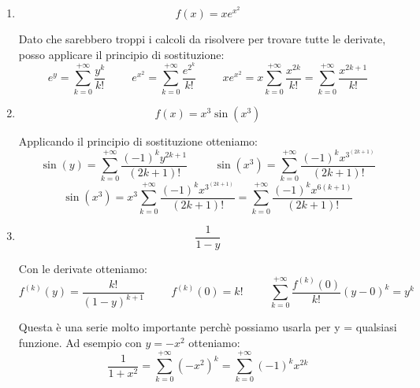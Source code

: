\begin{exercise}\phantom{}
    \begin{enumerate}
        \item \begin{equation*}f(x)=xe^{x^2}\end{equation*}
    
    Dato che sarebbero troppi i calcoli da risolvere per trovare tutte le derivate, posso applicare il principio di sostituzione:
    \begin{equation*}
        e^y=\sum^{+\infty}_{k=0}\frac{y^k}{k!}\hspace{1cm}e^{x^2}=\sum^{+\infty}_{k=0}\frac{e^{2^k}}{k!}\hspace{1cm}xe^{x^2}=x\sum^{+\infty}_{k=0}\frac{x^{2k}}{k!}=\sum^{+\infty}_{k=0}\frac{x^{2k+1}}{k!}
    \end{equation*}
    
        
        \item \begin{equation*}f(x)=x^3\sin(x^3)\end{equation*}
        
        Applicando il principio di sostituzione otteniamo:
        \begin{equation*}
            \sin(y)=\sum^{+\infty}_{k=0}\frac{(-1)^ky^{2k+1}}{(2k+1)!}\hspace{1cm}\sin(x^3)=\sum^{+\infty}_{k=0}\frac{(-1)^kx^{3^{(2k+1)}}}{(2k+1)!}
        \end{equation*}
        \begin{equation*}
            \sin(x^3)=x^3\sum^{+\infty}_{k=0}\frac{(-1)^kx^{3^{(2k+1)}}}{(2k+1)!}=\sum^{+\infty}_{k=0}\frac{(-1)^kx^{6(k+1)}}{(2k+1)!}
        \end{equation*}
        
        
        \item \begin{equation*}\frac{1}{1-y}\end{equation*}
        
        Con le derivate otteniamo:
        \begin{equation*}
            f^{(k)}(y)=\frac{k!}{(1-y)^{k+1}}\hspace{1cm}f^{(k)}(0)=k!\hspace{1cm}\sum^{+\infty}_{k=0}\frac{f^{(k)}(0)}{k!}(y-0)^k=y^k
        \end{equation*}
        
        Questa è una serie molto importante perchè possiamo usarla per y = qualsiasi funzione. Ad esempio con $y=-x^2$ otteniamo:
        \begin{equation*}
            \frac{1}{1+x^2}=\sum^{+\infty}_{k=0}(-x^2)^k=\sum^{+\infty}_{k=0}(-1)^kx^{2k}
        \end{equation*}
        

\end{enumerate}
\end{exercise}

